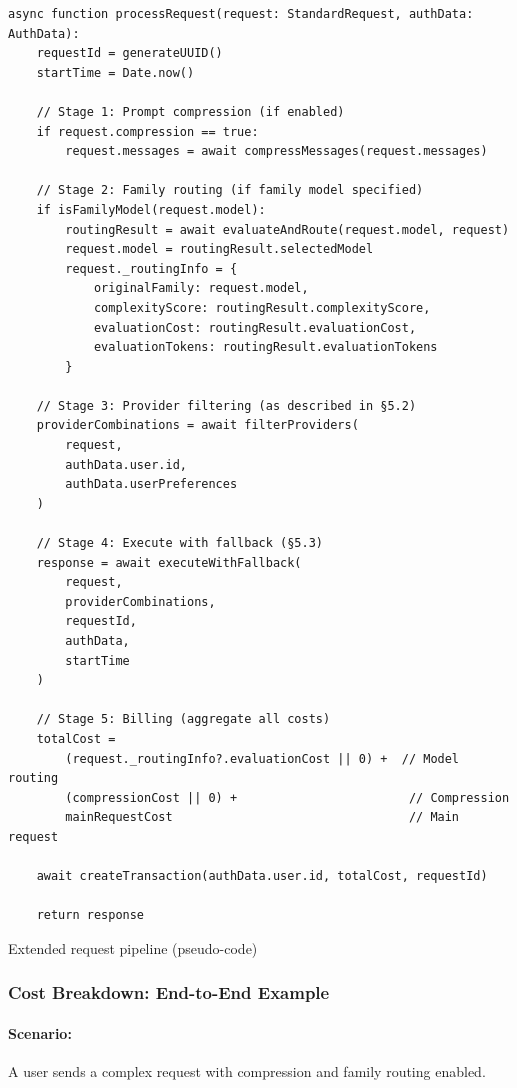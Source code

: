\documentclass[english]{article}
\begin{document}
\begin{listing}[H]
\begin{verbatim}
async function processRequest(request: StandardRequest, authData: AuthData):
    requestId = generateUUID()
    startTime = Date.now()

    // Stage 1: Prompt compression (if enabled)
    if request.compression == true:
        request.messages = await compressMessages(request.messages)

    // Stage 2: Family routing (if family model specified)
    if isFamilyModel(request.model):
        routingResult = await evaluateAndRoute(request.model, request)
        request.model = routingResult.selectedModel
        request._routingInfo = {
            originalFamily: request.model,
            complexityScore: routingResult.complexityScore,
            evaluationCost: routingResult.evaluationCost,
            evaluationTokens: routingResult.evaluationTokens
        }

    // Stage 3: Provider filtering (as described in §5.2)
    providerCombinations = await filterProviders(
        request,
        authData.user.id,
        authData.userPreferences
    )

    // Stage 4: Execute with fallback (§5.3)
    response = await executeWithFallback(
        request,
        providerCombinations,
        requestId,
        authData,
        startTime
    )

    // Stage 5: Billing (aggregate all costs)
    totalCost =
        (request._routingInfo?.evaluationCost || 0) +  // Model routing
        (compressionCost || 0) +                        // Compression
        mainRequestCost                                 // Main request

    await createTransaction(authData.user.id, totalCost, requestId)

    return response
\end{verbatim}
\caption{Extended request pipeline (pseudo-code)}
\end{listing}

\subsubsection{Cost Breakdown: End-to-End Example}

\paragraph{Scenario:} A user sends a complex request with compression and family routing enabled.
\end{document}
